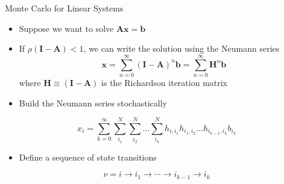 \documentclass{beamer}
\begin{document}
\begin{frame}{Monte Carlo for Linear Systems}
  \begin{itemize}
    \item Suppose we want to solve $\mathbf{Ax}=\mathbf{b}$
    \vfill
    \item If $\rho(\mathbf{I-A})<1$, we can write the solution using the
      Neumann series
      \begin{equation*}
        \mathbf{x} = \sum_{n=0}^{\infty} (\mathbf{I-A})^n \mathbf{b}
         = \sum_{n=0}^{\infty} \mathbf{H}^n \mathbf{b}
      \end{equation*}
      where $\mathbf{H} \equiv ( \mathbf{I-A} )$ is the Richardson
      iteration matrix
      \vfill
    \item Build the Neumann series stochastically
  \end{itemize}

  \[
  x_i = \sum_{k=0}^{\infty}\sum_{i_1}^{N}\sum_{i_2}^{N}\ldots
  \sum_{i_k}^{N}h_{i,i_1}h_{i_1,i_2}\ldots h_{i_{k-1},i_k}b_{i_k}
  \]

  \begin{itemize}
  \item Define a sequence of state transitions
  \end{itemize}
  \vspace*{-0.1in}
  \[
  \nu = i \rightarrow i_1 \rightarrow \cdots \rightarrow i_{k-1}
  \rightarrow i_{k}
  \]

\end{frame}

\end{document}

